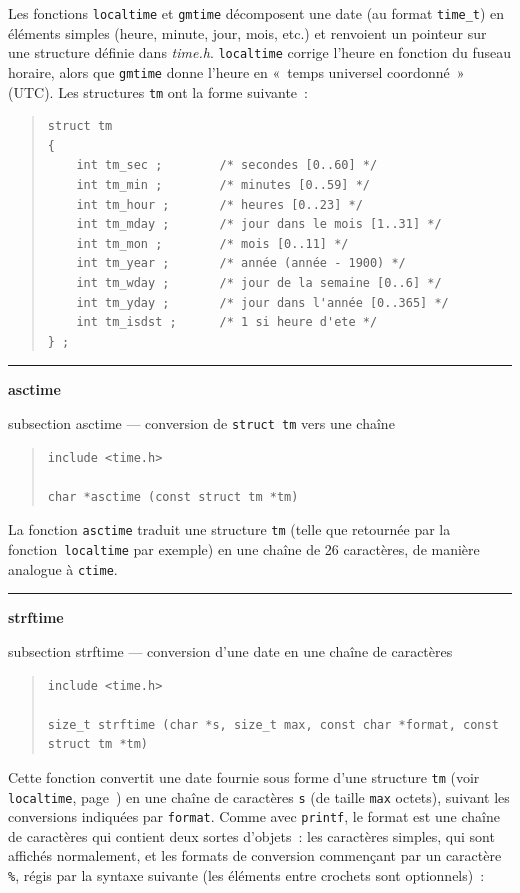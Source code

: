\documentclass [twoside] {report}
\newcommand {\primitive} [1]
    {
	\phantomsection
	{\large \textbf {#1}}
	\addcontentsline {toc} {subsection} {#1}
    }
\newcommand {\separation}
    {
	\vspace {5mm}
	\nopagebreak
	\hrule
    }
\begin{document}
Les fonctions \texttt {localtime} et \texttt {gmtime} décomposent une date (au
format \texttt {time\_t}) en éléments simples (heure, minute, jour,
mois, etc.) et renvoient un pointeur sur une structure définie dans {\em
time.h}.  \texttt {localtime} corrige l'heure en fonction du fuseau horaire,
alors que \texttt {gmtime} donne l'heure en «~temps universel coordonné~»
(UTC).  Les structures \texttt {tm} ont la forme suivante~:
    \label {struct-tm}

\begin {quote}
\begin {verbatim}
struct tm
{
    int tm_sec ;        /* secondes [0..60] */
    int tm_min ;        /* minutes [0..59] */
    int tm_hour ;       /* heures [0..23] */
    int tm_mday ;       /* jour dans le mois [1..31] */
    int tm_mon ;        /* mois [0..11] */
    int tm_year ;       /* année (année - 1900) */
    int tm_wday ;       /* jour de la semaine [0..6] */
    int tm_yday ;       /* jour dans l'année [0..365] */
    int tm_isdst ;      /* 1 si heure d'ete */
} ;
\end{verbatim}
\end {quote}


\separation
\primitive {asctime} --- conversion de \texttt {struct tm} vers une chaîne

\begin {quote}
\begin {verbatim}
include <time.h>

char *asctime (const struct tm *tm)
\end{verbatim}
\end {quote}


La fonction \texttt {asctime} traduit une structure \texttt {tm} (telle que
retournée par la fonction~\texttt {localtime} par exemple) en une chaîne
de 26 caractères, de manière analogue à \texttt {ctime}.


\separation
\primitive {strftime} --- conversion d'une date en une chaîne de caractères

\begin {quote}
\begin {verbatim}
include <time.h>

size_t strftime (char *s, size_t max, const char *format, const struct tm *tm)
\end{verbatim}
\end {quote}

Cette fonction convertit une date fournie sous forme d'une structure
\texttt {tm} (voir \texttt {localtime}, page~\pageref {struct-tm}) en
une chaîne de caractères \texttt {s} (de taille \texttt {max} octets),
suivant les conversions indiquées par \texttt {format}.
Comme avec \texttt {printf}, le format est une chaîne de caractères
qui contient deux sortes d'objets~:  les caractères simples, qui sont
affichés normalement, et les formats de conversion commençant par un
caractère \texttt {\%}, régis par la syntaxe suivante (les éléments entre
crochets sont optionnels)~:
\end{document}
